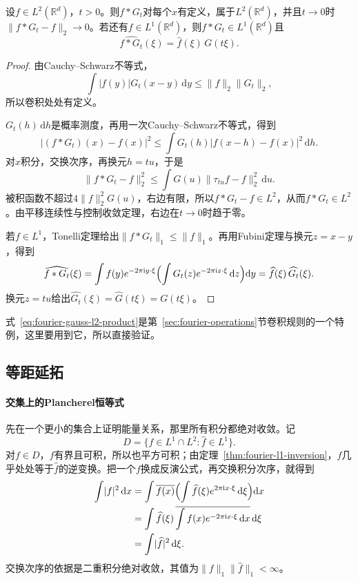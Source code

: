 \begin{lemma}[$L^2$中的Gauss光滑化]
\label{lem:fourier-gauss-l2}
设$f\in L^2(\mathbb R^d)$，$t>0$。则$f*G_t$对每个$x$有定义，属于$L^2(\mathbb R^d)$，并且$t\to0$时$\lVert f*G_t-f\rVert_2\to0$。若还有$f\in L^1(\mathbb R^d)$，则$f*G_t\in L^1(\mathbb R^d)$且
\begin{equation}
\widehat{f*G_t}(\xi)=\widehat f(\xi)\,G(t\xi).
\label{eq:fourier-gauss-l2-product}
\end{equation}
\end{lemma}

\begin{proof}
由Cauchy--Schwarz不等式，
\[
\int\lvert f(y)\rvert G_t(x-y)\,\mathrm dy\leq\lVert f\rVert_2\lVert G_t\rVert_2,
\]
所以卷积处处有定义。

$G_t(h)\,\mathrm dh$是概率测度，再用一次Cauchy--Schwarz不等式，得到
\[
\lvert(f*G_t)(x)-f(x)\rvert^2\leq\int G_t(h)\lvert f(x-h)-f(x)\rvert^2\,\mathrm dh.
\]
对$x$积分，交换次序，再换元$h=tu$，于是
\[
\lVert f*G_t-f\rVert_2^2\leq\int G(u)\lVert\tau_{tu}f-f\rVert_2^2\,\mathrm du.
\]
被积函数不超过$4\lVert f\rVert_2^2G(u)$，右边有限，所以$f*G_t-f\in L^2$，从而$f*G_t\in L^2$。由平移连续性与控制收敛定理，右边在$t\to0$时趋于零。

若$f\in L^1$，Tonelli定理给出$\lVert f*G_t\rVert_1\leq\lVert f\rVert_1$。再用Fubini定理与换元$z=x-y$，得到
\[
\widehat{f*G_t}(\xi)=\int f(y)e^{-2\pi\mathrm iy\cdot\xi}\Bigl(\int G_t(z)e^{-2\pi\mathrm iz\cdot\xi}\,\mathrm dz\Bigr)\mathrm dy=\widehat f(\xi)\,\widehat{G_t}(\xi).
\]
换元$z=tu$给出$\widehat{G_t}(\xi)=\widehat G(t\xi)=G(t\xi)$。
\end{proof}

式~\eqref{eq:fourier-gauss-l2-product}是第~\ref{sec:fourier-operations}节卷积规则的一个特例，这里要用到它，所以直接验证。

\subsection{等距延拓}
\label{sec:fourier-l2-extension}

\paragraph{交集上的Plancherel恒等式}

先在一个更小的集合上证明能量关系，那里所有积分都绝对收敛。记
\[
D=\{f\in L^1\cap L^2:\widehat f\in L^1\}.
\]
对$f\in D$，$\widehat f$有界且可积，所以也平方可积；由定理~\ref{thm:fourier-l1-inversion}，$f$几乎处处等于$\widehat f$的逆变换。把一个$f$换成反演公式，再交换积分次序，就得到
\[
\begin{aligned}
\int\lvert f\rvert^2\,\mathrm dx
&=\int\overline{f(x)}\Bigl(\int\widehat f(\xi)e^{2\pi\mathrm ix\cdot\xi}\,\mathrm d\xi\Bigr)\mathrm dx\\
&=\int\widehat f(\xi)\,\overline{\int f(x)e^{-2\pi\mathrm ix\cdot\xi}\,\mathrm dx}\,\mathrm d\xi\\
&=\int\lvert\widehat f\rvert^2\,\mathrm d\xi .
\end{aligned}
\]
交换次序的依据是二重积分绝对收敛，其值为$\lVert f\rVert_1\lVert\widehat f\rVert_1<\infty$。

